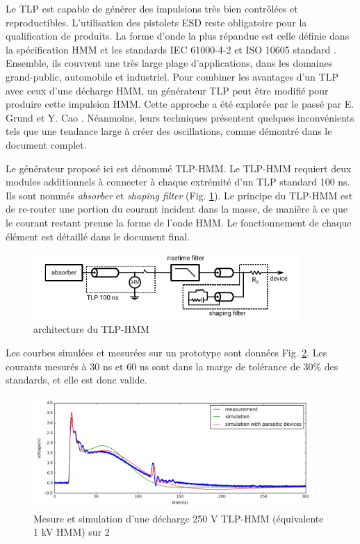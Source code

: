 Le TLP est capable de générer des impulsions très bien contrôlées et reproductibles.
L'utilisation des pistolets ESD reste obligatoire pour la qualification de produits.
La forme d'onde la plus répandue est celle définie dans la spécification HMM \cite{hmm} et les standards IEC 61000-4-2 \cite{iec61000-4-2} et ISO 10605 standard \cite{iso10605}.
Ensemble, ils couvrent une très large plage d'applications, dans les domaines grand-public, automobile et industriel.
Pour combiner les avantages d'un TLP avec ceux d'une décharge HMM, un générateur TLP peut être modifié pour produire cette impulsion HMM.
Cette approche a été explorée par le passé par E. Grund \cite{iec61000-tlp} et Y. Cao \cite{tlp-based-hmm}.
Néanmoins, leurs techniques présentent quelques inconvénients tels que une tendance large à créer des oscillations, comme démontré dans le document complet.

Le générateur proposé ici est dénommé TLP-HMM.
Le TLP-HMM requiert deux modules additionnels à connecter à chaque extrémité d'un TLP standard 100 ns.
Ils sont nommés \textit{absorber} et \textit{shaping filter} (Fig. \ref{fig:tlp_hmm_architecture}).
Le principe du TLP-HMM est de re-router une portion du courant incident dans la masse, de manière à ce que le courant restant prenne la forme de l'onde HMM.
Le fonctionnement de chaque élément est détaillé dans le document final.

\begin{figure}[!h]
  \centering
  \includegraphics[width=0.9\textwidth]{src/1/figures/beges_tlp_hmm.pdf}
  \caption{architecture du TLP-HMM}
  \label{fig:tlp_hmm_architecture}
\end{figure}

Les courbes simulées et mesurées sur un prototype sont données Fig. \ref{fig:tlp_hmm_waveforms}.
Les courants mesurés à 30 ns et 60 ns sont dans la marge de tolérance de 30\% des standards, et elle est donc valide.

\begin{figure}[!h]
  \centering
  \includegraphics[width=0.95\textwidth]{src/1/figures/tlp_hmm_waveforms.png}
  \caption{Mesure et simulation d'une décharge 250 V TLP-HMM (équivalente 1 kV HMM) sur 2\textOmega{}}
  \label{fig:tlp_hmm_waveforms}
\end{figure}

